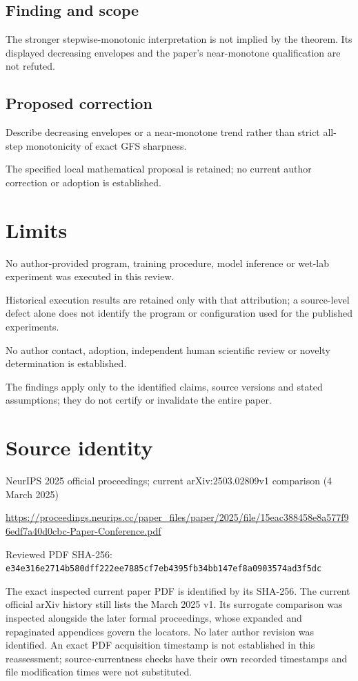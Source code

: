 \documentclass[11pt]{article}
\begin{document}
\subsection*{Finding and scope}

The stronger stepwise-monotonic interpretation is not implied by the theorem. Its displayed decreasing envelopes and the paper's near-monotone qualification are not refuted.

\subsection*{Proposed correction}

Describe decreasing envelopes or a near-monotone trend rather than strict all-step monotonicity of exact GFS sharpness.

The specified local mathematical proposal is retained; no current author correction or adoption is established.

\section*{Limits}

No author-provided program, training procedure, model inference or wet-lab experiment was executed in this review.\par

Historical execution results are retained only with that attribution; a source-level defect alone does not identify the program or configuration used for the published experiments.\par

No author contact, adoption, independent human scientific review or novelty determination is established.\par

The findings apply only to the identified claims, source versions and stated assumptions; they do not certify or invalidate the entire paper.\par

\section*{Source identity}

NeurIPS 2025 official proceedings; current arXiv:2503.02809v1 comparison (4 March 2025)

\url{https://proceedings.neurips.cc/paper_files/paper/2025/file/15eac388458e8a577f96edf7a40d0cbc-Paper-Conference.pdf}

Reviewed PDF SHA-256: \nolinkurl{e34e316e2714b580dff222ee7885cf7eb4395fb34bb147ef8a0903574ad3f5dc}

The exact inspected current paper PDF is identified by its SHA-256. The current official arXiv history still lists the March 2025 v1. Its surrogate comparison was inspected alongside the later formal proceedings, whose expanded and repaginated appendices govern the locators. No later author revision was identified. An exact PDF acquisition timestamp is not established in this reassessment; source-currentness checks have their own recorded timestamps and file modification times were not substituted.
\end{document}
